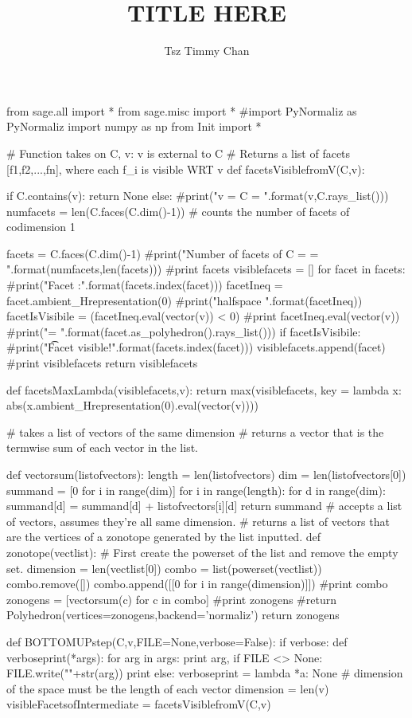 \documentclass{TC}
\title{TITLE HERE}	%
\author{Tsz Timmy Chan}	%
\begin{document}
\begin{SAGE}
from sage.all import *
from sage.misc import *
#import PyNormaliz as PyNormaliz
import numpy as np
from Init import *

# Function takes on C, v: v is external to C
# 	Returns a list of facets [f1,f2,...,fn], where each f_i is visible WRT v
def facetsVisiblefromV(C,v):

	if C.contains(v):
		return None
	else:
		#print("v = {}\n C = \n{}".format(v,C.rays_list()))
		numfacets = len(C.faces(C.dim()-1)) # counts the number of facets of codimension 1

		facets = C.faces(C.dim()-1)
		#print("Number of facets of C = {} = {}".format(numfacets,len(facets)))
		#print facets
		visiblefacets = []
		for facet in facets:
			#print("Facet {}:".format(facets.index(facet)))
			facetIneq = facet.ambient_Hrepresentation(0)
			#print("\tambient halfspace {}".format(facetIneq))
			facetIsVisibile = (facetIneq.eval(vector(v)) < 0)
			#print facetIneq.eval(vector(v))
			#print("\trays = {}".format(facet.as_polyhedron().rays_list()))
			if facetIsVisibile:
				#print("\t Facet {} visible!".format(facets.index(facet)))
				visiblefacets.append(facet)
		#print visiblefacets
		return visiblefacets


def facetsMaxLambda(visiblefacets,v):
	return max(visiblefacets, key = lambda x: abs(x.ambient_Hrepresentation(0).eval(vector(v))))


# takes a list of vectors of the same dimension
# returns a vector that is the termwise sum of each vector in the list.

def vectorsum(listofvectors):
	length = len(listofvectors)
	dim = len(listofvectors[0])
	summand = [0 for i in range(dim)]
	for i in range(length):
		for d in range(dim):
			summand[d] = summand[d] + listofvectors[i][d]
	return summand
# accepts a list of vectors, assumes they're all same dimension.
# returns a list of vectors that are the vertices of a zonotope generated by the list inputted.
def zonotope(vectlist):
	# First create the powerset of the list	and remove the empty set.
	dimension = len(vectlist[0])
	combo = list(powerset(vectlist))
	combo.remove([])
	combo.append([[0 for i in range(dimension)]])
	#print combo
	zonogens = [vectorsum(c) for c in combo]
	#print zonogens
	#return Polyhedron(vertices=zonogens,backend='normaliz')
	return zonogens


def BOTTOMUPstep(C,v,FILE=None,verbose=False):
	if verbose:
		def verboseprint(*args):
			for arg in args:
				print arg,
				if FILE <> None:
					FILE.write("\n"+str(arg))
			print
	else:
		verboseprint = lambda *a: None 
	# dimension of the space must be the length of each vector
	dimension = len(v)
	visibleFacetsofIntermediate = facetsVisiblefromV(C,v)


\end{SAGE}
\end{document}
